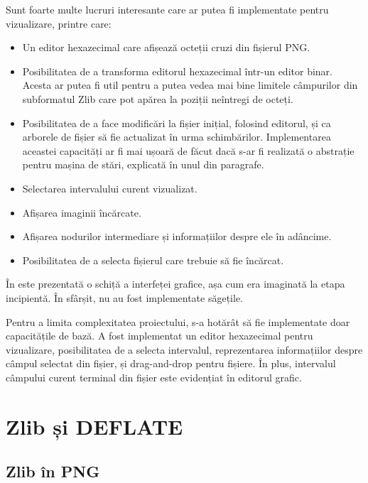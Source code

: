\documentclass[a4paper,12pt]{report}
\begin{document}
Sunt foarte multe lucruri interesante care ar putea fi implementate pentru vizualizare, printre care:
\begin{itemize}
    \item
        Un editor hexazecimal care afișează octeții cruzi din fișierul \ac{PNG}. 
    \item
        Posibilitatea de a transforma editorul hexazecimal într-un editor binar.
        Acesta ar putea fi util pentru a putea vedea mai bine limitele câmpurilor din
        subformatul Zlib care pot apărea la poziții neîntregi de octeți.
    \item
        Posibilitatea de a face modificări la fișier inițial, folosind editorul,
        și ca arborele de fișier să fie actualizat în urma schimbărilor.
        Implementarea aceastei capacități ar fi mai ușoară de făcut dacă s-ar fi realizată
        o abstrație pentru mașina de stări, explicată în unul din paragrafe.
    \item
        Selectarea intervalului curent vizualizat.
    \item
        Afișarea imaginii încărcate.
    \item
        Afișarea nodurilor intermediare și informațiilor despre ele în adâncime.
    \item
        Posibilitatea de a selecta fișierul care trebuie să fie încărcat.
\end{itemize}

În  este prezentată o schiță a interfeței grafice,
așa cum era imaginată la etapa incipientă.
În sfârșit, nu au fost implementate săgețile.


Pentru a limita complexitatea proiectului, s-a hotărât să fie implementate doar capacitățile de bază.
A fost implementat un editor hexazecimal pentru vizualizare, posibilitatea de a selecta intervalul,
reprezentarea informațiilor despre câmpul selectat din fișier, și drag-and-drop pentru fișiere.
În plus, intervalul câmpului curent terminal din fișier este evidențiat în editorul grafic.

\section{Zlib și DEFLATE}

\subsection{Zlib în \ac{PNG}}
\end{document}
